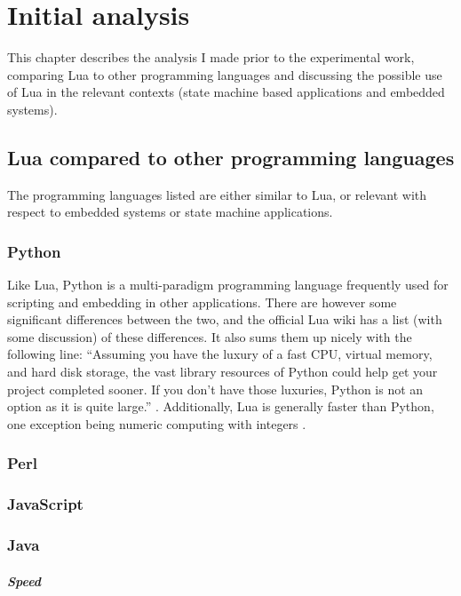 \chapter{Initial analysis}
\label{ch:initial_analysis}
This chapter describes the analysis I made prior to the experimental work, comparing Lua to other programming languages and discussing the possible use of Lua in the relevant contexts (state machine based applications and embedded systems).


\section{Lua compared to other programming languages}
\label{sec:lua_compared}
The programming languages listed are either similar to Lua, or relevant with respect to embedded systems or state machine applications.

\subsection{Python}
Like Lua, Python is a multi-paradigm programming language frequently used for scripting and embedding in other applications. There are however some significant differences between the two, and the official Lua wiki has a list (with some discussion) of these differences. It also sums them up nicely with the following line: ``Assuming you have the luxury of a fast CPU, virtual memory, and hard disk storage, the vast library resources of Python could help get your project completed sooner. If you don't have those luxuries, Python is not an option as it is quite large.'' \cite{website:lua_wiki_python}. Additionally, Lua is generally faster than Python, one exception being numeric computing with integers \cite{website:lua_perl_python_vs}.

\subsection{Perl}

\subsection{JavaScript}

\subsection{Java}
\label{sec:lua_comp_java}

\paragraph{Speed}

